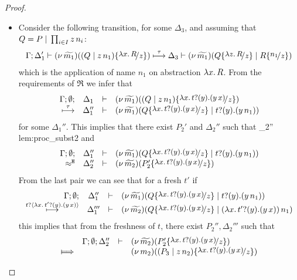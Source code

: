 \begin{proof}
\begin{enumerate}
\begin{itemize}
					\item	Consider the following transition, for some $\Delta_3$, and assuming that $Q = P \;|\; \prod_{i \in I} z\, {n_i}$:
							\begin{eqnarray}
								\horel{\Gamma}{\Delta_1'}{\newsp{\widetilde{m_1}}{(Q \Par \appl{z}{n_1}) \subst{{\abs{x}{R}}}{z} }}
								{\hby{\tau}}
								{\Delta_3}{\newsp{\widetilde{m_1}}{Q \subst{{\abs{z}{R}}}{z} \Par R \subst{n_1}{z}  }}
								\label{lem:proc_subst1}
							\end{eqnarray}
							which is the application of name $n_1$ on abstraction $\lambda x.\,R$.
							From the requirements of $\Re$ we infer that
							\begin{eqnarray*}
								\mhorel{\Gamma}{\Delta_1}{\newsp{\widetilde{m_1}}{(Q \Par \appl{z}{n_1}) \subst{\trvalx{t}}{z} }}
								{\hby{\tau}}
								{\Delta_1''}{}{\newsp{\widetilde{m_1}}{Q \subst{\trvalx{t}}{z} \Par \binp{t}{y} (\appl{y}{n_1})}}
							\end{eqnarray*}
							for some $\Delta_1''$. This implies that there exist $P_2'$ and $\Delta_2''$ such that
								{\Hby{}}
								{\Delta_2''}{}
								{lem:proc_subst2}
							and
							\begin{eqnarray*}
								\mhorel{\Gamma}{\Delta_1''}{\newsp{\widetilde{m_1}}{Q \subst{\trvalx{t}}{z} \Par \binp{t}{y} (\appl{y}{n_1})}}
								{\hwb}
								{\Delta_2''}{}{\newsp{\widetilde{m_2}}{P_2' \subst{\trvalx{t}}{z}}}
							\end{eqnarray*}
							From the last pair we can see that for a fresh $t'$ if
							\begin{eqnarray*}
								\mhorel{\Gamma}{\Delta_1''}{\newsp{\widetilde{m_1}}{Q \subst{\trvalx{t}}{z} \Par \binp{t}{y} (\appl{y}{n_1})}}
								{\hby{\bactinp{t}{\trvalx{t'}}}}
								{\Delta_1'''}{}{\newsp{\widetilde{m_2}}{Q \subst{\trvalx{t}}{z} \Par \appl{(\trvalx{t'})}{n_1}}}
							\end{eqnarray*}
							this implies that from the freshness of $t$, there exist $P_2'', \Delta_2'''$ such that
							\begin{eqnarray}
								\begin{array}{crll}
											& \Gamma; \es; \Delta_2'' &\proves& \newsp{\widetilde{m_2}}{P_2'\subst{\trvalx{t}}{z}}
									\\
									\Hby{}	&	&&	\newsp{m_2}{(P_3 \Par \appl{z}{n_2}) \subst{\trvalx{t}}{z}}

\end{array}
\end{eqnarray}
\end{itemize}
\end{enumerate}
\end{proof}
